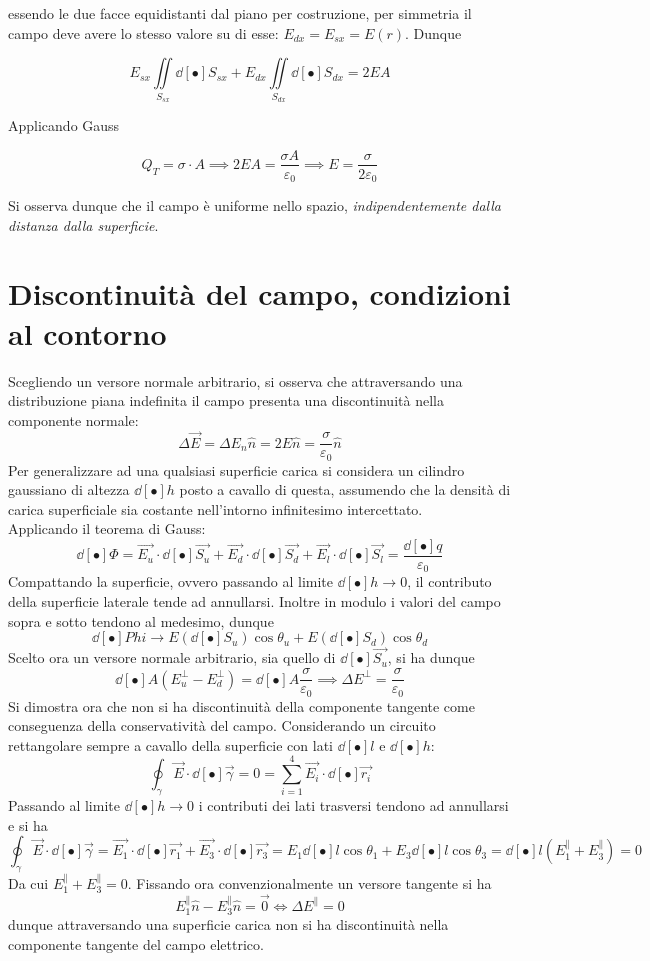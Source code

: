 essendo le due facce equidistanti dal piano per costruzione, per simmetria il campo deve avere lo stesso valore su di esse: $E_{dx} = E_{sx} = E(r)$. Dunque

\[E_{sx} \iint\limits_{S_{sx}}\dd[•]{S_{sx}} + E_{dx} \iint\limits_{S_{dx}}\dd[•]{S_{dx}} = 2 E A\]

Applicando Gauss

\[Q_T = \sigma \cdot A \implies 2 E A = \frac{\sigma A}{\varepsilon_0} \implies E = \frac{\sigma}{2 \varepsilon_0}\]

Si osserva dunque che il campo è uniforme nello spazio, \textit{indipendentemente dalla distanza dalla superficie}.

\section{Discontinuità del campo, condizioni al contorno}
Scegliendo un versore normale arbitrario, si osserva che attraversando una distribuzione piana indefinita il campo presenta una discontinuità nella componente normale:
\[\Delta \vec{E} = \Delta E_n \hat{n} = 2 E \hat{n} = \frac{\sigma}{\varepsilon_0} \hat{n}\]
Per generalizzare ad una qualsiasi superficie carica si considera un cilindro gaussiano di altezza $\dd[•]{h}$ posto a cavallo di questa, assumendo che la densità di carica superficiale sia costante nell'intorno infinitesimo intercettato. 
\\Applicando il teorema di Gauss:
\[\dd[•]{\Phi} = \vec{E_u} \cdot \dd[•]{\vec{S_u}} + \vec{E_d} \cdot \dd[•]{\vec{S_d}} + \vec{E_l} \cdot \dd[•]{\vec{S_l}} = \frac{\dd[•]{q}}{\varepsilon_0}\]
Compattando la superficie, ovvero passando al limite $\dd[•]{h} \rightarrow 0$, il contributo della superficie laterale tende ad annullarsi. Inoltre in modulo i valori del campo sopra e sotto tendono al medesimo, dunque
\[\dd[•]{Phi} \rightarrow E (\dd[•]{S_u}) \cos \theta_u + E (\dd[•]{S_d}) \cos \theta_d\]
Scelto ora un versore normale arbitrario, sia quello di $\dd[•]{\vec{S_u}}$, si ha dunque
\[\dd[•]{A} ( E_u^\perp - E_d^\perp) = \dd[•]{A} \frac{\sigma}{\varepsilon_0} \implies \Delta E^\perp = \frac{\sigma}{\varepsilon_0}\]
Si dimostra ora che non si ha discontinuità della componente tangente come conseguenza della conservatività del campo. Considerando un circuito rettangolare sempre a cavallo della superficie con lati $\dd[•]{l}$ e $\dd[•]{h}$:
\[\oint_\gamma \vec{E} \cdot \dd[•]{\vec{\gamma}} = 0 = \sum\limits_{i=1}^{4} \vec{E_i} \cdot \dd[•]{\vec{r_i}}\]
Passando al limite $\dd[•]{h} \rightarrow 0$ i contributi dei lati trasversi tendono ad annullarsi e si ha
\[\oint_\gamma \vec{E} \cdot \dd[•]{\vec{\gamma}} = \vec{E_1} \cdot \dd[•]{\vec{r_1}} + \vec{E_3} \cdot \dd[•]{\vec{r_3}} = E_1 \dd[•]{l} \cos \theta_1 + E_3 \dd[•]{l} \cos \theta_3 = \dd[•]{l} (E_1^{\parallel} + E_3^{\parallel}) = 0\]
Da cui $E_1^{\parallel} + E_3^{\parallel} = 0$. Fissando ora convenzionalmente un versore tangente si ha
\[E_1^{\parallel} \hat{n} - E_3^{\parallel} \hat{n} = \vec{0} \Longleftrightarrow \Delta E^{\parallel} = 0\]
dunque attraversando una superficie carica non si ha discontinuità nella componente tangente del campo elettrico.

